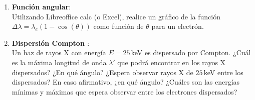 \documentclass[a4paper,12pt]{article}
\begin{document}
\begin{enumerate}
\item {\bf{Función angular}}:\\
	Utilizando Libreoffice calc (o Excel), realice un gráfico de la función
	$\Delta \lambda = \lambda_e (1 - \cos(\theta))$ como función de $\theta$
	para un electrón.

\item {\bf{Dispersión Compton }}:\\
	Un haz de rayos X con energía $E=25$\,keV es dispersado por Compton. ¿Cuál
	es la máxima longitud de onda $\lambda'$ que podrá encontrar en los rayos X
	dispersados? ¿En qué ángulo? ¿Espera observar rayos X de $25$\,keV entre
	los dispersados? En caso afirmativo, ¿en qué ángulo? ¿Cuáles son las
	energías mínimas y máximas que espera observar entre los electrones
	dispersados? 
\end{enumerate}
\end{document}
